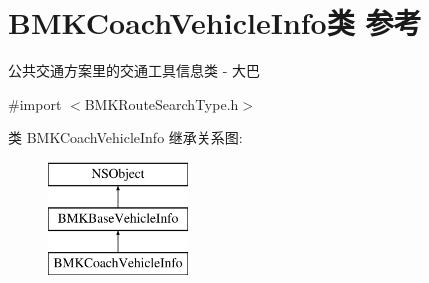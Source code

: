 \hypertarget{interface_b_m_k_coach_vehicle_info}{}\section{B\+M\+K\+Coach\+Vehicle\+Info类 参考}
\label{interface_b_m_k_coach_vehicle_info}


公共交通方案里的交通工具信息类 -\/ 大巴  




{\ttfamily \#import $<$B\+M\+K\+Route\+Search\+Type.\+h$>$}

类 B\+M\+K\+Coach\+Vehicle\+Info 继承关系图\+:\begin{figure}[H]
\begin{center}
\leavevmode
\includegraphics[height=3.000000cm]{interface_b_m_k_coach_vehicle_info}
\end{center}
\end{figure}
